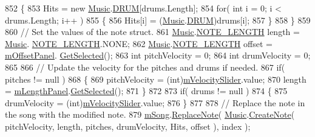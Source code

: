 \begin{DoxyCode}
852                 \{
853                     Hits = \textcolor{keyword}{new} \hyperlink{class_music}{Music}.\hyperlink{group___music_enums_gade475b4382c7066d1af13e7c13c029b6}{DRUM}[drums.Length];
854                     \textcolor{keywordflow}{for}( \textcolor{keywordtype}{int} i = 0; i < drums.Length; i++ )
855                     \{
856                         Hits[i] = (\hyperlink{class_music}{Music}.\hyperlink{group___music_enums_gade475b4382c7066d1af13e7c13c029b6}{DRUM})drums[i];
857                     \}
858                 \}
859 
860                 \textcolor{comment}{// Set the values of the note struct.}
861                 \hyperlink{class_music}{Music}.\hyperlink{group___music_enums_gaf11b5f079adbb21c800b9eca1c5c3cbd}{NOTE\_LENGTH} length = \hyperlink{class_music}{Music}.
      \hyperlink{group___music_enums_gaf11b5f079adbb21c800b9eca1c5c3cbd}{NOTE\_LENGTH}.NONE;
862                 \hyperlink{class_music}{Music}.\hyperlink{group___music_enums_gaf11b5f079adbb21c800b9eca1c5c3cbd}{NOTE\_LENGTH} offset = \hyperlink{group___s_c_priv_var_gafeeda8ab122f574c6fff94814234334c}{mOffsetPanel}.
      \hyperlink{group___s_c_handlers_gac1a7dd19ee5cf14d87a09e803432acd1}{GetSelected}();
863                 \textcolor{keywordtype}{int} pitchVelocity = 0;
864                 \textcolor{keywordtype}{int} drumVelocity = 0;
865 
866                 \textcolor{comment}{// Update the velocity for the pitches and drums if needed.}
867                 \textcolor{keywordflow}{if}( pitches != null )
868                 \{
869                     pitchVelocity = (int)\hyperlink{group___s_c_priv_var_ga0738678367556ebb69df6e73213f616d}{mVelocitySlider}.value;
870                     length = \hyperlink{group___s_c_priv_var_ga370237b50bc11a581fc963cdd8ffd4ea}{mLengthPanel}.\hyperlink{group___s_c_handlers_gac1a7dd19ee5cf14d87a09e803432acd1}{GetSelected}();
871                 \}
872 
873                 \textcolor{keywordflow}{if}( drums != null )
874                 \{
875                     drumVelocity = (int)\hyperlink{group___s_c_priv_var_ga0738678367556ebb69df6e73213f616d}{mVelocitySlider}.value;
876                 \}
877 
878                 \textcolor{comment}{// Replace the note in the song with the modified note.}
879                 \hyperlink{group___s_c_priv_var_ga9554e9b3758d1cc1e841a5f7d8aa9f56}{mSong}.\hyperlink{group___song_const_ga326d61c75339080057a02c6decb0cde3}{ReplaceNote}( \hyperlink{class_music}{Music}.\hyperlink{group___music_stat_func_gaaf74885e43eb623f64f961985fadcd08}{CreateNote}( pitchVelocity, length, 
      pitches, drumVelocity, Hits, offset ), index );

\end{DoxyCode}
